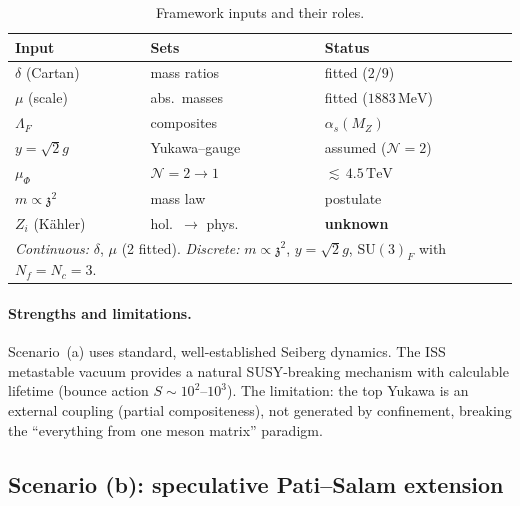 \documentclass[aps,prd,twocolumn,showpacs,preprintnumbers,superscriptaddress,floatfix]{revtex4-2}
\newcommand{\SU}{\mathrm{SU}}
\newcommand{\Nf}{N_{\!f}}
\newcommand{\Nc}{N_{\!c}}
\newcommand{\MeV}{\,\mathrm{MeV}}
\newcommand{\TeV}{\,\mathrm{TeV}}
\newcommand{\zch}{\mathfrak{z}}
\begin{document}
\begin{table}
\centering\small
\caption{Framework inputs and their roles.}
\label{tab:params}
\begin{tabular}{lll}
\hline
Input & Sets & Status \\
\hline
$\delta$ (Cartan) & mass ratios & fitted ($2/9$) \\
$\mu$ (scale) & abs.\ masses & fitted ($1883\MeV$) \\
$\Lambda_F$ & composites & $\alpha_s(M_Z)$ \\
$y{=}\sqrt{2}g$ & Yukawa--gauge & assumed ($\mathcal{N}{=}2$) \\
$\mu_\Phi$ & $\mathcal{N}{=}2{\to}1$ & ${\lesssim}\,4.5\TeV$ \\
$m{\propto}\zch^2$ & mass law & postulate \\
$Z_i$ (K\"ahler) & hol.\ $\to$ phys.\ & \textbf{unknown} \\
\hline
\multicolumn{3}{p{\columnwidth}}{%
\textit{Continuous:} $\delta$, $\mu$ (2 fitted).
\textit{Discrete:} $m \propto \zch^2$, $y = \sqrt{2}g$,
$\SU(3)_F$ with $\Nf{=}\Nc{=}3$.} \\
\hline
\end{tabular}
\end{table}

\paragraph{Strengths and limitations.}
Scenario~(a) uses standard, well-established Seiberg dynamics.
The ISS metastable vacuum provides a natural SUSY-breaking
mechanism with calculable lifetime (bounce action
$S \sim 10^2$--$10^3$).
The limitation: the top Yukawa is an external coupling
(partial compositeness), not generated by confinement, breaking
the ``everything from one meson matrix'' paradigm.

\subsection{Scenario (b): speculative Pati--Salam extension}
\end{document}
